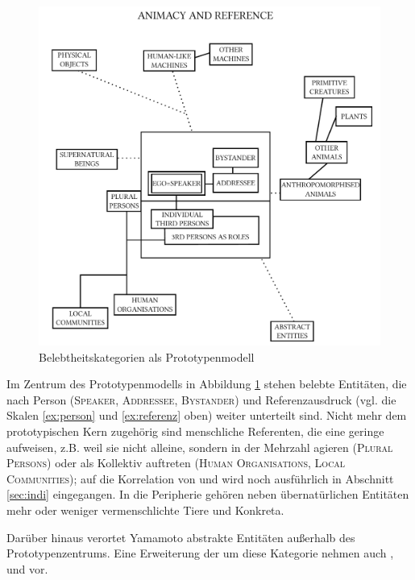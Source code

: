 \begin{figure}[p]
\includegraphics[width=\textwidth]{images/yamamoto2.pdf}
\caption {Belebtheitskategorien als Prototypenmodell \parencite[][38]{Yamamoto1999}\label{yamamoto}}
\end{figure} 


Im Zentrum des Prototypenmodells in Abbildung \ref{yamamoto} stehen belebte  Entitäten, die nach Person (\textsc{Speaker, Addressee, Bystander}) und Referenzausdruck (vgl. die Skalen \ref{ex:person}  und \ref{ex:referenz} oben) weiter unterteilt sind. Nicht mehr dem prototypischen Kern zugehörig sind menschliche Referenten, die eine geringe  aufweisen, z.B. weil sie nicht alleine, sondern in der Mehrzahl agieren (\textsc{Plural Persons}) oder als Kollektiv  auftreten (\textsc{Human Organisations, Local Communities}); auf die Korrelation von  und  wird noch ausführlich in Abschnitt \ref{sec:indi} eingegangen. In die Peripherie gehören neben übernatürlichen Entitäten mehr oder weniger vermenschlichte Tiere und  Konkreta.  

Darüber hinaus verortet Yamamoto abstrakte Entitäten  außerhalb des Prototypenzentrums. Eine Erweiterung der   um diese Kategorie nehmen auch \textcite{Allan1987} \textcite{Langacker1991}, und \textcite{Croft1995} vor. 


